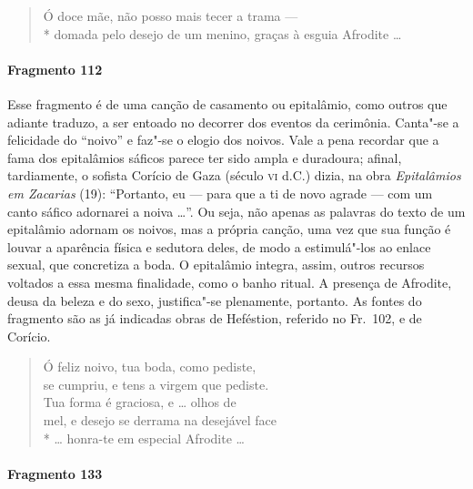 \begin{verse}
Ó doce mãe, não posso mais tecer a trama --- \\*
domada pelo desejo de um menino, graças à \qb{}esguia Afrodite \ldots{}
\end{verse}


\paragraph{Fragmento 112}

{\small Esse fragmento é de uma canção de casamento ou epitalâmio, como outros que
adiante traduzo, a ser entoado no decorrer dos eventos da cerimônia.
Canta"-se a felicidade do ``noivo” e faz"-se o elogio
dos noivos. Vale a pena recordar que a fama dos epitalâmios sáficos parece ter
sido ampla e duradoura; afinal, tardiamente, o sofista Corício de Gaza (século
\textsc{vi} d.C.) dizia, na obra \textit{Epitalâmios em Zacarias} (19): ``Portanto, eu
--- para que a ti de novo agrade --- com um canto sáfico adornarei a noiva \ldots{}”.
Ou seja, não apenas as palavras do texto de um epitalâmio adornam os noivos,
mas a própria canção, uma vez que sua função é louvar a aparência física e
sedutora deles, de modo a estimulá"-los ao enlace sexual, que concretiza a
boda. O epitalâmio integra, assim, outros recursos voltados a essa mesma finalidade,
como o banho ritual. A presença de Afrodite, deusa da beleza e do sexo,
justifica"-se plenamente, portanto. As fontes do fragmento são as já indicadas
obras de Heféstion, referido no Fr.~102, e de Corício.}

\begin{verse}
Ó feliz noivo, tua boda, como pediste,\\
se cumpriu, e tens a virgem que pediste.\\
Tua forma é graciosa, e \ldots{} olhos de\\
mel, e desejo se derrama na desejável face\\*
\ldots{} honra-te em especial Afrodite \ldots{}
\end{verse}

\paragraph{Fragmento 133}

